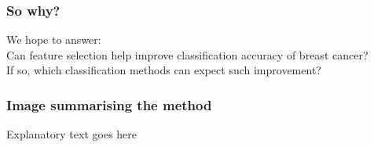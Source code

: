 \documentclass[aspectratio=1610]{beamer}
\begin{document}
\begin{frame}
  \frametitle{\hfill So why?}
  We hope to answer:\\
  \vspace{0.05\textheight}
  Can feature selection help improve classification accuracy of breast cancer?\\
  \vspace{0.05\textheight}
  If so, which classification methods can expect such improvement?\\
\end{frame}


\begin{frame}
  \frametitle{\hfill Image summarising the method}
  \begin{figure}[htp]
    \centering
  \end{figure}
  Explanatory text goes here
\end{frame}
\end{document}
